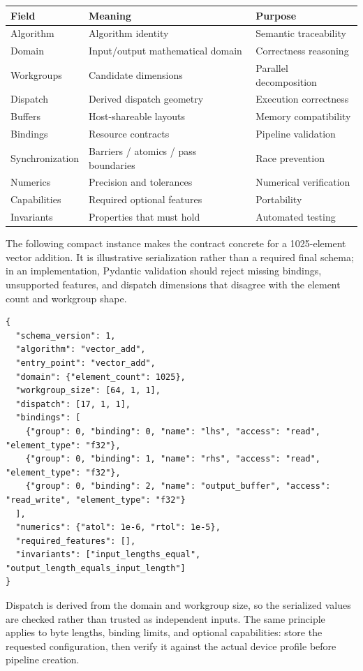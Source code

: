 \documentclass[11pt,a4paper,oneside]{report}
\begin{document}
\begin{longtable}{p{}p{}p{}}
\toprule
\textbf{Field} & \textbf{Meaning} & \textbf{Purpose}\\
\midrule
Algorithm & Algorithm identity & Semantic traceability\\
Domain & Input/output mathematical domain & Correctness reasoning\\
Workgroups & Candidate dimensions & Parallel decomposition\\
Dispatch & Derived dispatch geometry & Execution correctness\\
Buffers & Host-shareable layouts & Memory compatibility\\
Bindings & Resource contracts & Pipeline validation\\
Synchronization & Barriers / atomics / pass boundaries & Race prevention\\
Numerics & Precision and tolerances & Numerical verification\\
Capabilities & Required optional features & Portability\\
Invariants & Properties that must hold & Automated testing\\
\bottomrule
\end{longtable}

The following compact instance makes the contract concrete for a 1025-element vector addition.
It is illustrative serialization rather than a required final schema; in an implementation,
Pydantic validation should reject missing bindings, unsupported features, and dispatch dimensions
that disagree with the element count and workgroup shape.

\begin{lstlisting}[caption={Illustrative MathSpec instance for vector addition.}]
{
  "schema_version": 1,
  "algorithm": "vector_add",
  "entry_point": "vector_add",
  "domain": {"element_count": 1025},
  "workgroup_size": [64, 1, 1],
  "dispatch": [17, 1, 1],
  "bindings": [
    {"group": 0, "binding": 0, "name": "lhs", "access": "read", "element_type": "f32"},
    {"group": 0, "binding": 1, "name": "rhs", "access": "read", "element_type": "f32"},
    {"group": 0, "binding": 2, "name": "output_buffer", "access": "read_write", "element_type": "f32"}
  ],
  "numerics": {"atol": 1e-6, "rtol": 1e-5},
  "required_features": [],
  "invariants": ["input_lengths_equal", "output_length_equals_input_length"]
}
\end{lstlisting}

Dispatch is derived from the domain and workgroup size, so the serialized values are checked
rather than trusted as independent inputs. The same principle applies to byte lengths, binding
limits, and optional capabilities: store the requested configuration, then verify it against the
actual device profile before pipeline creation.
\end{document}
